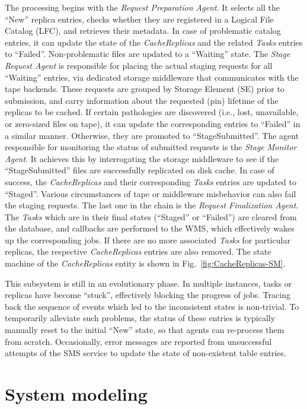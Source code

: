 \documentclass[sort&compress,preprint,3p]{elsarticle}
\begin{document}
The processing begins with the \textit{Request Preparation Agent}. It selects all the
``New'' replica entries, checks whether they are registered in a Logical
File Catalog (LFC), and retrieves their metadata. In case of problematic catalog
entries, it can update the state of the \textit{CacheReplicas} and the related \textit{Tasks}
entries to ``Failed''. Non-problematic files are updated to a
``Waiting'' state. The \textit{Stage Request Agent} is responsible for placing the actual staging
requests for all ``Waiting'' entries, via dedicated storage middleware that
communicates with the tape backends. These requests are grouped by Storage Element (SE) prior to
submission, and carry information about the requested (pin) lifetime of the
replicas to be cached. If certain pathologies are discovered (i.e., lost,
unavailable, or zero-sized files on tape), it can update the corresponding
entries to ``Failed'' in a similar manner. Otherwise, they are promoted to
``StageSubmitted''. The agent responsible for monitoring the status of submitted
requests is the \textit{Stage Monitor Agent}. It achieves this by interrogating the
storage middleware to see if the ``StageSubmitted'' files are successfully
replicated on disk cache. In case of success, the \textit{CacheReplicas} and their
corresponding \textit{Tasks} entries are updated to ``Staged''. Various circumstances of
tape or middleware misbehavior can also fail the staging requests. The last one
in the chain is the \textit{Request Finalization Agent}. The \textit{Tasks} which are in their
final states (``Staged'' or ``Failed'') are cleared from the database, and callbacks
are performed to the WMS, which effectively wakes up the corresponding jobs. If
there are no more associated \textit{Tasks} for particular replicas, the respective
\textit{CacheReplicas} entries are also removed. The state machine of the \textit{CacheReplicas}
entity is shown in Fig.~\ref{fig:CacheReplicas-SM}.

This subsystem is still in an evolutionary phase. In multiple instances, tasks or
replicas have become “stuck”, effectively blocking the progress of jobs. Tracing
back the sequence of events which led to the inconsistent states is non-trivial.
To temporarily alleviate such problems, the status of these entries is typically manually
reset to the initial ``New'' state, so that agents can re-process them from
scratch. Occasionally, error messages are reported from unsuccessful attempts of
the SMS service to update the state of non-existent table entries.

\section{System modeling}
\label{section3}
\end{document}
